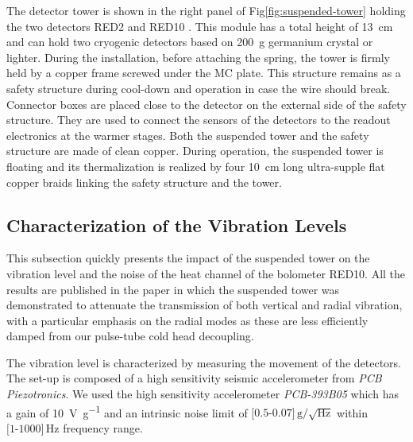 The detector tower is shown in the right panel of Fig\ref{fig:suspended-tower} holding the two detectors RED2 and RED10 . This module has a total height of \SI{13}{\cm} and can hold two cryogenic detectors based on \SI{200}{\g} germanium crystal or lighter. During the installation, before attaching the spring, the tower is firmly held by a copper frame screwed under the MC plate. This structure remains as a safety structure during cool-down and operation in case the wire should break. Connector boxes are placed close to the detector on the external side of the safety structure. They are used to connect the sensors of the detectors to the readout electronics at the warmer stages. Both the suspended tower and the safety structure are made of clean  copper. During operation, the suspended tower is floating and its thermalization is realized by four \SI{10}{\cm} long ultra-supple flat copper braids linking the safety structure and the tower.


\subsection{Characterization of the Vibration Levels}

This subsection quickly presents the impact of the suspended tower on the vibration level and the noise of the heat channel of the bolometer RED10. All the results are published in the paper \cite{Maisonobe:2018tbq} in which the suspended tower was demonstrated to attenuate the transmission of both vertical and radial vibration, with a particular emphasis on the radial modes as these are less efficiently damped from our pulse-tube cold head decoupling. 

The vibration level is characterized by measuring the movement of the detectors.
The set-up is composed of a high sensitivity seismic accelerometer from \emph{PCB Piezotronics}. We used the high sensitivity accelerometer \emph{PCB-393B05} which has a gain of \SI{10}{\volt\per g} and an intrinsic noise limit of $\textrm{[0.5-0.07]}\,\textrm{g}/\sqrt{\textrm{Hz}}$ within $\textrm{[1-1000]}\,\si{\Hz}$ frequency range.

